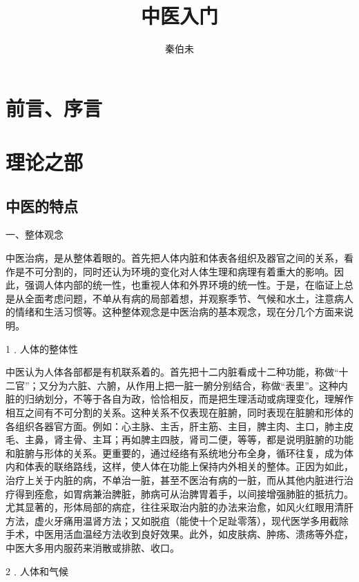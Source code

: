 \documentclass[a4paper,12pt,UTF8,twoside]{ctexbook}
\title{\heiti\zihao{0} 中医入门}
\author{秦伯未}
\date{}
\begin{document}
\maketitle
\tableofcontents

\frontmatter
\chapter{前言、序言}



\mainmatter

\chapter{理论之部}

\section{中医的特点}

一、整体观念

中医治病，是从整体着眼的。首先把人体内脏和体表各组织及器官之间的关系，看作是不可分割的，同时还认为环境的变化对人体生理和病理有着重大的影响。因此，强调人体内部的统一性，也重视人体和外界环境的统一性。于是，在临证上总是从全面考虑问题，不单从有病的局部着想，并观察季节、气候和水土，注意病人的情绪和生活习惯等。这种整体观念是中医治病的基本观念，现在分几个方面来说明。

1﹒人体的整体性

中医认为人体各部都是有机联系着的。首先把十二内脏看成十二种功能，称做“十二官”；又分为六脏、六腑，从作用上把一脏一腑分别结合，称做“表里”。这种内脏的归纳划分，不等于各自为政，恰恰相反，而是把生理活动或病理变化，理解作相互之间有不可分割的关系。这种关系不仅表现在脏腑，同时表现在脏腑和形体的各组织各器官方面。例如：心主脉、主舌，肝主筋、主目，脾主肉、主口，肺主皮毛、主鼻，肾主骨、主耳；再如脾主四肢，肾司二便，等等，都是说明脏腑的功能和脏腑与形体的关系。更重要的，通过经络有系统地分布全身，循环往复，成为体内和体表的联络路线，这样，使人体在功能上保持内外相关的整体。正因为如此，治疗上关于内脏的病，不单治一脏，甚至不医治有病的一脏，而从其他内脏进行治疗得到痊愈，如胃病兼治脾脏，肺病可从治脾胃着手，以间接增强肺脏的抵抗力。尤其显著的，形体局部的病症，往往采取治内脏的办法来治愈，如风火红眼用清肝方法，虚火牙痛用温肾方法；又如脱疽（能使十个足趾零落），现代医学多用截除手术，中医用活血温经方法收到良好效果。此外，如皮肤病、肿疡、溃疡等外症，中医大多用内服药来消散或排脓、收口。

2﹒人体和气候
\end{document}
